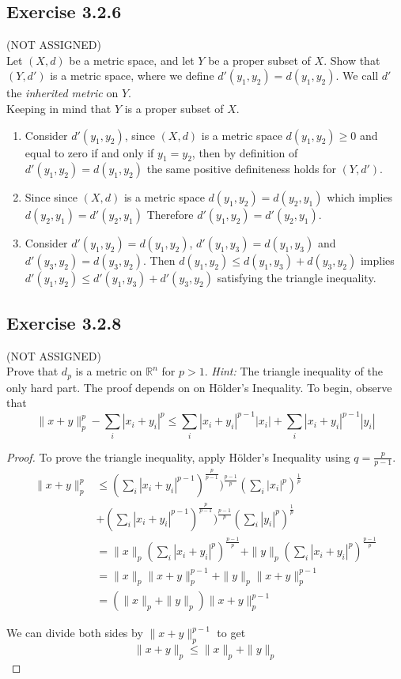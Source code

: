 \documentclass{tufte-book}
\theoremstyle{mytheoremstyle}
\theoremstyle{mylemstyle}
\theoremstyle{mydefstyle}
\begin{document}
\subsection{Exercise 3.2.6} (NOT ASSIGNED)\\
Let $(X,d)$ be a metric space, and let $Y$ be a proper subset of $X$.  Show that $(Y,d')$ is a metric space, where we define $d'(y_1,y_2) = d(y_1,y_2)$.  We call $d'$ the \textit{inherited metric} on $Y$.\\

Keeping in mind that $Y$ is a proper subset of $X$.
\begin{enumerate}

\item Consider $d'(y_1, y_2)$, since $(X,d)$ is a metric space $d(y_1, y_2) \geq 0$ and equal to zero if and only if $y_1 = y_2$, then by definition of $d'(y_1, y_2) = d(y_1,y_2)$ the same positive definiteness holds for $(Y,d')$.

\item Since since $(X,d)$ is a metric space $d(y_1, y_2) = d(y_2, y_1)$ which implies $d(y_2, y_1) = d'(y_2, y_1)$  Therefore  $d'(y_1, y_2) = d'(y_2, y_1)$.

\item Consider $d'(y_1, y_2) = d(y_1,y_2)$, $d'(y_1, y_3) = d(y_1,y_3)$ and $d'(y_3, y_2) = d(y_3,y_2)$. Then $d(y_1, y_2) \leq d(y_1, y_3) + d(y_3, y_2)$ implies $d'(y_1, y_2) \leq d'(y_1, y_3) + d'(y_3, y_2)$ satisfying the triangle inequality.

\end{enumerate}

\subsection{Exercise 3.2.8}
(NOT ASSIGNED)\\
Prove that $d_p$ is a metric on $\mathbb{R}^n$ for $p>1$. \textit{Hint:} The triangle inequality of the only hard part.  The proof depends on on H{\"o}lder's Inequality.  To begin, observe that
\[\|x + y\|_p^p - \sum_i|x_i+y_i|^p \leq \sum_i|x_i+y_i|^{p-1}|x_i| +\sum_i|x_i+y_i|^{p-1}|y_i| \]

\begin{proof}
To prove the triangle inequality, apply H{\"o}lder's Inequality using $q = \frac{p}{p-1}$.
\begin{align*}
\|x+y\|_p^p &\leq (\sum_i|x_i+y_i|^{p-1})^{\frac{p}{p-1}})^{\frac{p-1}{p}}(\sum_i|x_i|^p)^{\frac{1}{p}}\\
&+ (\sum_i|x_i+y_i|^{p-1})^{\frac{p}{p-1}})^{\frac{p-1}{p}}(\sum_i|y_i|^p)^{\frac{1}{p}}\\
&= \|x\|_p(\sum_i|x_i+y_i|^p)^{\frac{p-1}{p}} + \|y\|_p(\sum_i|x_i+y_i|^p)^{\frac{p-1}{p}}\\
&= \|x\|_p \|x+y\|_p^{p-1} +\|y\|_p \|x+y\|_p^{p-1}\\
&= (\|x\|_p + \|y\|_p) \|x+y\|_p^{p-1}
\end{align*}

We can divide both sides by $\|x+y\|_p^{p-1}$ to get
\[\|x+y\|_p \leq \|x\|_p + \|y\|_p \]
\end{proof}
\end{document}
